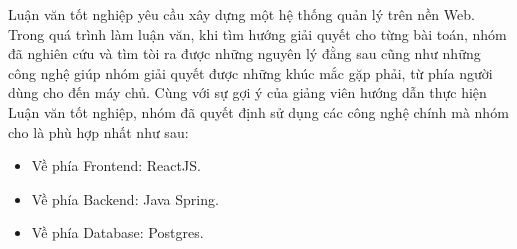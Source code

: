 Luận văn tốt nghiệp yêu cầu xây dựng một hệ thống quản lý trên nền Web. Trong quá trình làm luận văn, khi tìm hướng giải quyết cho từng bài toán, nhóm đã nghiên cứu và tìm tòi ra được những nguyên lý đằng sau cũng như những công nghệ giúp nhóm giải quyết được những khúc mắc gặp phải, từ phía người dùng cho đến máy chủ. Cùng với sự gợi ý của giảng viên hướng dẫn thực hiện Luận văn tốt nghiệp, nhóm đã quyết định sử dụng các công nghệ chính mà nhóm cho là phù hợp nhất như sau:

\begin{itemize}
    \item Về phía Frontend: ReactJS.
    \item Về phía Backend: Java Spring.
    \item Về phía Database: Postgres.
\end{itemize}